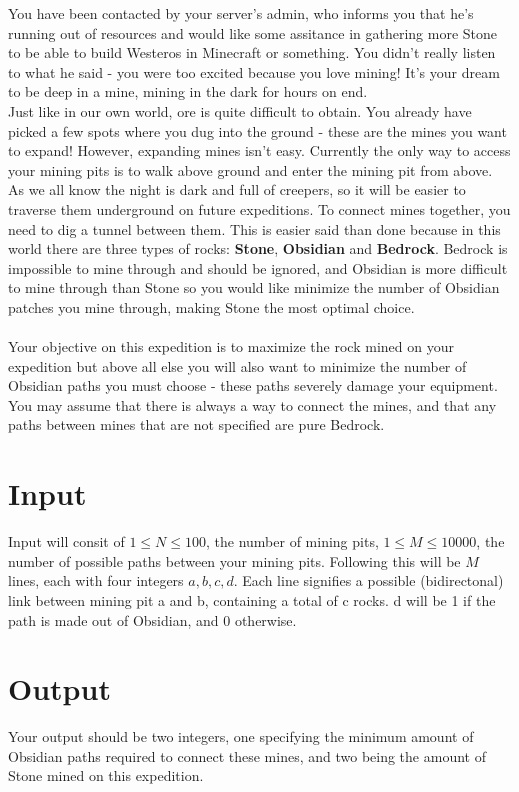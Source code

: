 
\noindent You have been contacted by your server's admin, who informs you that he's running out of resources and would like
some assitance in gathering more Stone to be able to build Westeros in Minecraft or something. You didn't really listen to what
he said - you were too excited because you love mining! It's your dream to be deep in a mine, mining in the dark for hours on end.\\

\noindent Just like in our own world, ore is quite difficult to obtain. You already have picked a few spots where you dug
into the ground - these are the mines you want to expand! However, expanding mines isn't easy. Currently the only way to access 
your mining pits is to walk above ground and enter the mining pit from above. As we all know the night is dark and full 
of creepers, so it will be easier to traverse them underground on future expeditions. To connect mines together,
you need to dig a tunnel between them. This is easier said than done because in this world there are three types of rocks:
\textbf{Stone}, \textbf{Obsidian} and \textbf{Bedrock}. Bedrock is impossible to mine through and should
be ignored, and Obsidian is more difficult to mine through than Stone so you would like minimize
the number of Obsidian patches you mine through, making Stone the most optimal choice.\\ \\

\noindent Your objective on this expedition is to maximize the rock mined on your expedition but above all
else you will also want to minimize the number of Obsidian paths you must choose - these paths severely damage your equipment. You may 
assume that there is always a way to connect the mines, and that any paths between mines that are not specified are pure Bedrock.

\section*{Input}
Input will consit of $1 \leq N \leq 100$, the number of mining pits, $1 \leq M \leq 10000$, the number of possible paths
between your mining pits. Following this will be $M$ lines, each with four integers $a,b,c,d$. Each line signifies a
possible (bidirectonal) link between mining pit a and b, containing a total of c rocks. d will be 1 if the path is made out of
Obsidian, and 0 otherwise.

\section*{Output}
Your output should be two integers, one specifying the minimum amount of Obsidian paths required to connect these mines,
and two being the amount of Stone mined on this expedition.